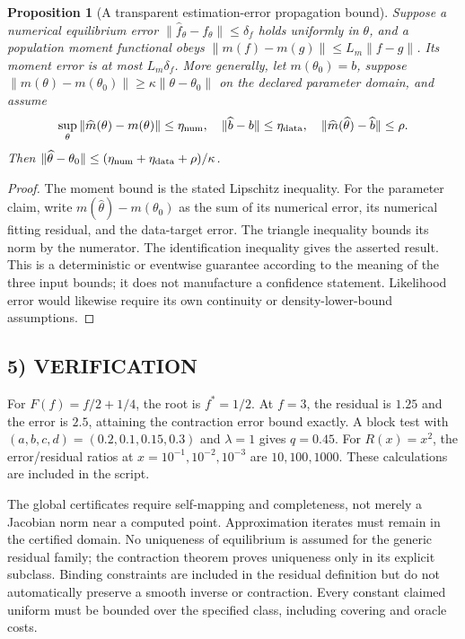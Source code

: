 \documentclass[11pt,a4paper]{article}
\newtheorem{proposition}[theorem]{Proposition}
\theoremstyle{definition}
\begin{document}
\begin{proposition}[A transparent estimation-error propagation bound]
Suppose a numerical equilibrium error $\|\widehat f_\theta-f_\theta\|\le\delta_f$ holds uniformly in $\theta$, and a population moment functional obeys
$\|m(f)-m(g)\|\le L_m\|f-g\|$. Its moment error is at most $L_m\delta_f$. More generally, let $m(\theta_0)=b$, suppose
$\|m(\theta)-m(\theta_0)\|\ge\kappa\|\theta-\theta_0\|$ on the declared parameter domain, and assume
\[
 \sup_\theta\|\widehat m(\theta)-m(\theta)\|\le\eta_{\rm num},
 \quad \|\widehat b-b\|\le\eta_{\rm data},
 \quad \|\widehat m(\widehat\theta)-\widehat b\|\le\rho.
\]
Then $\|\widehat\theta-\theta_0\|\le(\eta_{\rm num}+\eta_{\rm data}+\rho)/\kappa$.
\end{proposition}
\begin{proof}
The moment bound is the stated Lipschitz inequality. For the parameter claim, write $m(\widehat\theta)-m(\theta_0)$ as the sum of its numerical error, its numerical fitting residual, and the data-target error. The triangle inequality bounds its norm by the numerator. The identification inequality gives the asserted result. This is a deterministic or eventwise guarantee according to the meaning of the three input bounds; it does not manufacture a confidence statement. Likelihood error would likewise require its own continuity or density-lower-bound assumptions.
\end{proof}

\subsection*{5) VERIFICATION}
For $F(f)=f/2+1/4$, the root is $f^*=1/2$. At $f=3$, the residual is $1.25$ and the error is $2.5$, attaining the contraction error bound exactly. A block test with $(a,b,c,d)=(0.2,0.1,0.15,0.3)$ and $\lambda=1$ gives $q=0.45$. For $R(x)=x^2$, the error/residual ratios at $x=10^{-1},10^{-2},10^{-3}$ are $10,100,1000$. These calculations are included in the script.

The global certificates require self-mapping and completeness, not merely a Jacobian norm near a computed point. Approximation iterates must remain in the certified domain. No uniqueness of equilibrium is assumed for the generic residual family; the contraction theorem proves uniqueness only in its explicit subclass. Binding constraints are included in the residual definition but do not automatically preserve a smooth inverse or contraction. Every constant claimed uniform must be bounded over the specified class, including covering and oracle costs.
\end{document}
